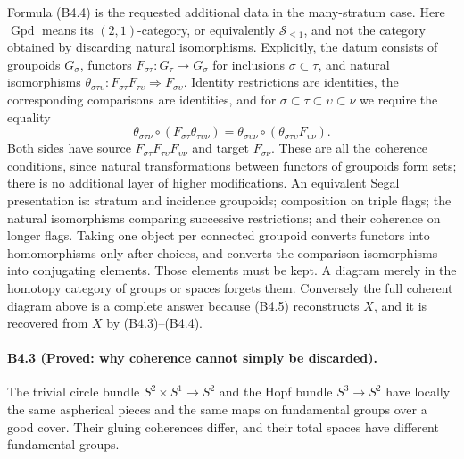Formula (B4.4) is the requested additional data in the many-stratum
case. Here $\operatorname{Gpd}$ means its $(2,1)$-category, or
equivalently $\mathcal S_{\leq1}$, and not the category obtained by
discarding natural isomorphisms. Explicitly, the datum consists of
groupoids $G_\sigma$, functors
$F_{\sigma\tau}:G_\tau\to G_\sigma$ for inclusions
$\sigma\subset\tau$, and natural isomorphisms
$\theta_{\sigma\tau\upsilon}:F_{\sigma\tau}F_{\tau\upsilon}
\Rightarrow F_{\sigma\upsilon}$. Identity restrictions are identities,
the corresponding comparisons are identities, and for
$\sigma\subset\tau\subset\upsilon\subset\nu$ we require the equality
\[
 \theta_{\sigma\tau\nu}\circ
          (F_{\sigma\tau}\theta_{\tau\upsilon\nu})
 =\theta_{\sigma\upsilon\nu}\circ
          (\theta_{\sigma\tau\upsilon}F_{\upsilon\nu}).
 \tag{B4.8}
\]
Both sides have source
$F_{\sigma\tau}F_{\tau\upsilon}F_{\upsilon\nu}$ and target
$F_{\sigma\nu}$. These are all the coherence conditions, since
natural transformations between functors of groupoids form sets;
there is no additional layer of higher modifications.
An equivalent Segal presentation is: stratum and incidence groupoids;
composition on triple flags; the natural isomorphisms comparing
successive restrictions; and their coherence on longer flags.
Taking one object per connected groupoid converts functors into
homomorphisms only after choices, and converts the comparison
isomorphisms into conjugating elements. Those elements must be kept.
A diagram merely in the homotopy category of groups or spaces
forgets them. Conversely the full coherent diagram above is a
complete answer because (B4.5) reconstructs $X$, and it is recovered
from $X$ by (B4.3)--(B4.4).

\paragraph{B4.3 (Proved: why coherence cannot simply be discarded).}
The trivial circle bundle $S^2\times S^1\to S^2$ and the Hopf
bundle $S^3\to S^2$ have locally the same aspherical pieces and the
same maps on fundamental groups over a good cover. Their gluing
coherences differ, and their total spaces have different fundamental
groups.

